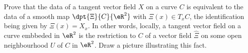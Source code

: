\begin{exercice}\label{exo007}

 Prove that the data of a tangent vector field $X$ on a curve $C$ is equivalent to the data
of a smooth map $\dpt{ \Xi }{ C }{ \eR^2 }$ with $\Xi(x)\in T_xC$, the identification being given by $\Xi(x)=X_x$.  In other words, locally, a tangent vector field on
a curve embbeded in $\eR^2$ is the restriction to $C$ of a vector field $\hat{\Xi}$ on some open neighbourhood  $U$
of $C$ in $\eR^2$. Draw a picture illustrating this fact.

\end{exercice}
